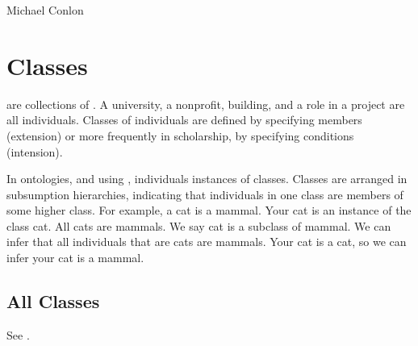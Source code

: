 \documentclass[letterpaper,10pt,english]{sphinxmanual}
\begin{document}
\begin{sphinxShadowBox}

\sphinxAtStartPar
Michael Conlon 
\end{sphinxShadowBox}


\chapter{Classes}
\label{\detokenize{classes:classes}}\label{\detokenize{classes::doc}}
\sphinxAtStartPar
{} are collections of .  A university, a nonprofit, building,
and a role in a project are
all individuals.  Classes of individuals are defined by specifying members
(extension) or more frequently
in scholarship, by specifying conditions (intension).

\sphinxAtStartPar
In ontologies, and using {\hyperref[\detokenize{glossary:glossary}]{}}, individuals
instances of classes. Classes are arranged
in subsumption hierarchies, indicating that individuals in one class are members of some
higher class.  For example, a cat is a mammal.  Your cat is an instance of the
class cat.  All cats are mammals.  We say cat is a subclass of mammal.  We can infer
that all individuals that are
cats are mammals.  Your cat is a cat, so we can infer your cat is a mammal.


\section{All Classes}
\label{\detokenize{classes:all-classes}}
\sphinxAtStartPar
See {\hyperref[\detokenize{classes:table-5}]{}}.
\end{document}
